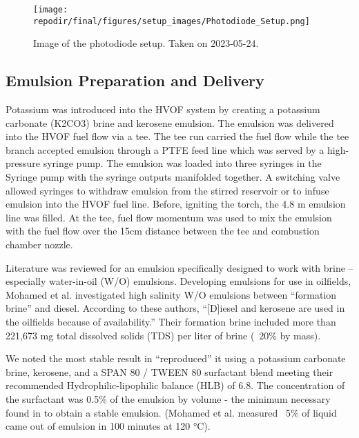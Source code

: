 \begin{figure}[]
    \centering
    \texttt{[image: \\repodir/final/figures/setup\_images/Photodiode\_Setup.png]}
    \caption{Image of the photodiode setup. Taken on 2023-05-24. }
    \label{fig:SI_PD_setup_image}
\end{figure}






\clearpage
\subsection{Emulsion Preparation and Delivery}

Potassium was introduced into the HVOF system by creating a potassium carbonate (K2CO3) brine and kerosene emulsion. The emulsion was delivered into the HVOF fuel flow via a tee. The tee run carried the fuel flow while the tee branch accepted emulsion through a PTFE feed line which was served by a high-pressure syringe pump. The emulsion was loaded into three syringes in the Syringe pump with the syringe outputs manifolded together. A switching valve allowed syringes to withdraw emulsion from the stirred reservoir or to infuse emulsion into the HVOF fuel line. Before, igniting the torch, the 4.8 m emulsion line was filled. At the tee, fuel flow momentum was used to mix the emulsion with the fuel flow over the 15cm distance between the tee and combustion chamber nozzle. 

Literature was reviewed for an emulsion specifically designed to work with brine – especially water-in-oil (W/O) emulsions.  Developing emulsions for use in oilfields, Mohamed et al.\cite{mohamedInfluenceSurfactantStructure2017a} investigated high salinity W/O emulsions between “formation brine” and diesel. According to these authors, “[D]iesel and kerosene are used in the oilfields because of availability.” Their formation brine included more than 221,673 mg total dissolved solids (TDS) per liter of brine (~20\% by mass).  

We noted the most stable result in \cite{mohamedInfluenceSurfactantStructure2017a} “reproduced” it using a potassium carbonate brine, kerosene, and a SPAN 80 / TWEEN 80 surfactant blend meeting their recommended Hydrophilic-lipophilic balance (HLB) of 6.8. The concentration of the surfactant was 0.5\% of the emulsion by volume - the minimum necessary found in \cite{mohamedInfluenceSurfactantStructure2017a} to obtain a stable emulsion. (Mohamed et al. measured ~5\% of liquid came out of emulsion in 100 minutes at 120 °C).  

